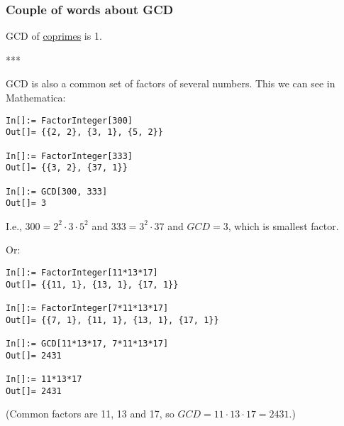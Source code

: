 \subsubsection{Couple of words about GCD}

GCD of \href{https://yurichev.com/blog/RSA/}{coprimes} is 1.

***

GCD is also a common set of factors of several numbers.
This we can see in Mathematica:

\begin{lstlisting}
In[]:= FactorInteger[300]
Out[]= {{2, 2}, {3, 1}, {5, 2}}

In[]:= FactorInteger[333]
Out[]= {{3, 2}, {37, 1}}

In[]:= GCD[300, 333]
Out[]= 3
\end{lstlisting}

I.e., $300=2^2 \cdot 3 \cdot 5^2$ and $333=3^2 \cdot 37$ and $GCD=3$, which is smallest factor.

Or:

\begin{lstlisting}
In[]:= FactorInteger[11*13*17]
Out[]= {{11, 1}, {13, 1}, {17, 1}}

In[]:= FactorInteger[7*11*13*17]
Out[]= {{7, 1}, {11, 1}, {13, 1}, {17, 1}}

In[]:= GCD[11*13*17, 7*11*13*17]
Out[]= 2431

In[]:= 11*13*17
Out[]= 2431
\end{lstlisting}

(Common factors are 11, 13 and 17, so $GCD = 11 \cdot 13 \cdot 17 = 2431$.)

